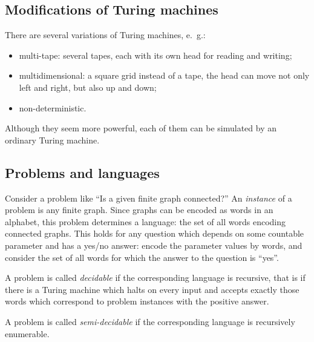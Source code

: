 \begin{page}
\setcounter{section}{8}
\setcounter{subsection}{3}
\setcounter{dfn}{4}
\label{portion:1191}

\subsection{Modifications of Turing machines}
There are several variations of Turing machines, e.~g.:
\begin{itemize}
\item
multi-tape: several tapes, each with its own head for reading and writing;
\item
multidimensional: a square grid instead of a tape, the head can move not only left and right, but also up and down;
\item
non-deterministic.
\end{itemize}
Although they seem more powerful, each of them can be simulated by an ordinary Turing machine.




\end{page}

\begin{page}
\setcounter{section}{8}
\setcounter{subsection}{3}
\setcounter{dfn}{4}
\label{portion:1192}

\subsection{Problems and languages}
Consider a problem like ``Is a given finite graph connected?''
An \emph{instance} of a problem is any finite graph.
Since graphs can be encoded as words in an alphabet, this problem determines a language:
the set of all words encoding connected graphs.
This holds for any question which depends on some countable parameter and has a yes/no answer:
encode the parameter values by words, and consider the set of all words for which the answer to the question is ``yes''.


\end{page}

\begin{page}
\setcounter{section}{8}
\setcounter{subsection}{3}
\setcounter{dfn}{5}
\label{portion:1194}

\begin{dfn}
A problem is called \emph{decidable} if the corresponding language is recursive,
that is if there is a Turing machine which halts on every input
and accepts exactly those words which correspond to problem instances with the positive answer.

A problem is called \emph{semi-decidable} if the corresponding language is recursively enumerable.
\end{dfn}

\end{page}

